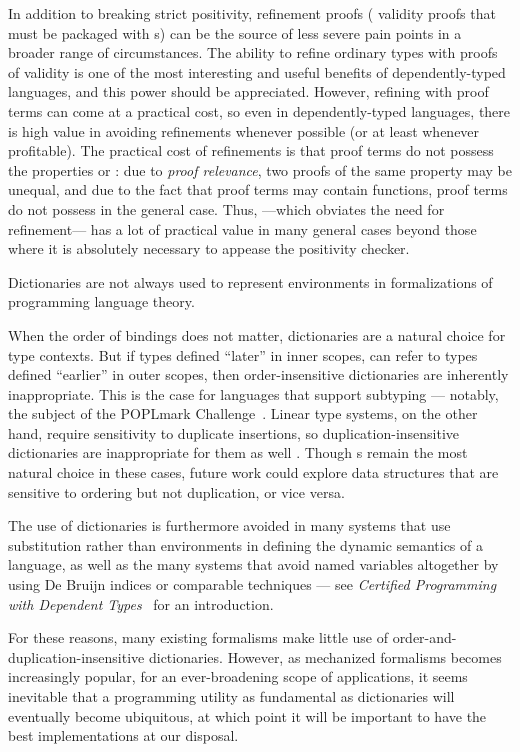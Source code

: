 In addition to breaking strict positivity, refinement proofs (\eg{} validity proofs that must be packaged with \cal{}s) can be the source of less severe pain points in
a broader range of circumstances.
The ability to refine ordinary types with proofs of validity is one of the most interesting and useful benefits of
dependently-typed languages, and this power should be appreciated. However, refining with proof terms can
come at a practical cost, so even in dependently-typed languages, there is high value in avoiding refinements
whenever possible (or at least whenever profitable). The practical cost of refinements is that proof terms
do not possess the properties \SemInj{} or \EqDec: due to \emph{proof relevance}, two proofs of
the same property may be unequal, and due to the fact that proof terms may contain functions, proof terms do not
possess \EqDec{} in the general case. Thus, \SemTot{} ---which obviates the need for refinement--- has
a lot of practical value in many general cases beyond those where it is absolutely necessary to appease the
positivity checker.


Dictionaries are not always used to represent environments in formalizations of programming language theory.

When the order of bindings does not matter, dictionaries are a natural choice for type contexts.
%
But if types defined ``later'' in inner scopes, can refer to types defined ``earlier'' in outer scopes, then order-insensitive dictionaries are inherently inappropriate.
%
This is the case for languages that support subtyping --- notably, the subject of the POPLmark Challenge~\citep{POPLmark}.
%
Linear type systems, on the other hand, require sensitivity to duplicate insertions, so duplication-insensitive dictionaries are inappropriate for them as well \citep{StructProp}.
%
Though {\sal}s remain the most natural choice in these cases, future work could explore data structures that are sensitive to ordering but not duplication, or vice versa.

The use of dictionaries is furthermore avoided in many systems that use substitution rather than environments
%
in defining the dynamic semantics of a language, as well as the many systems that avoid named variables altogether by using De Bruijn indices or comparable techniques --- see \emph{Certified Programming with Dependent Types}~\cite[Library Firstorder]{cpdt} for an introduction.

For these reasons, many existing formalisms make little use of order-and-duplication-insensitive dictionaries. 
%
However, as mechanized formalisms becomes increasingly popular, for an ever-broadening scope of applications,
%
it seems inevitable that a programming utility as fundamental as dictionaries will eventually become ubiquitous, at which point it will be important to have the
%
best implementations at our disposal.

